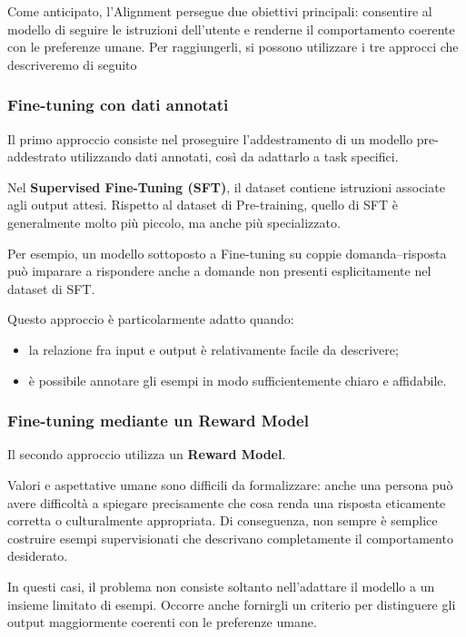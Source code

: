 Come anticipato, l’Alignment persegue due obiettivi principali: consentire al modello di seguire le istruzioni dell’utente e renderne il comportamento coerente con le preferenze umane. Per raggiungerli, si possono utilizzare i tre approcci che descriveremo di seguito
\subsubsection*{Fine-tuning con dati annotati}

Il primo approccio consiste nel proseguire l'addestramento di un
modello pre-addestrato utilizzando dati annotati, così da adattarlo
a task specifici.

Nel \textbf{Supervised Fine-Tuning (SFT)}, il dataset contiene
istruzioni associate agli output attesi. Rispetto al dataset
di Pre-training, quello di SFT è generalmente molto più piccolo,
ma anche più specializzato.

Per esempio, un modello sottoposto a Fine-tuning su coppie
domanda--risposta può imparare a rispondere anche a domande
non presenti esplicitamente nel dataset di SFT.

Questo approccio è particolarmente adatto quando:

\begin{itemize}
    \item la relazione fra input e output è relativamente facile
    da descrivere;

    \item è possibile annotare gli esempi in modo sufficientemente
    chiaro e affidabile.
\end{itemize}

\subsubsection*{Fine-tuning mediante un Reward Model}

Il secondo approccio utilizza un \textbf{Reward Model}.

Valori e aspettative umane sono difficili da formalizzare:
anche una persona può avere difficoltà a spiegare precisamente
che cosa renda una risposta eticamente corretta o culturalmente
appropriata. Di conseguenza, non sempre è semplice costruire
esempi supervisionati che descrivano completamente il
comportamento desiderato.

In questi casi, il problema non consiste soltanto nell'adattare
il modello a un insieme limitato di esempi. Occorre anche
fornirgli un criterio per distinguere gli output maggiormente
coerenti con le preferenze umane.

